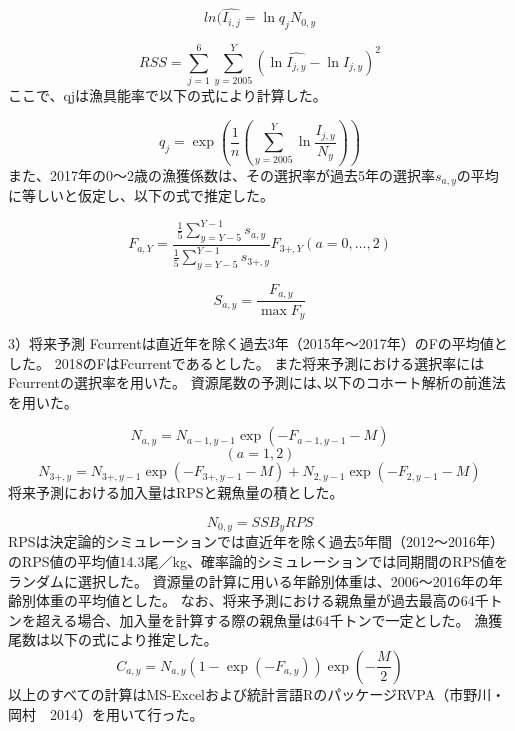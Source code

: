 \begin{equation}
 ln(\hat{I_{i,j}}= \ln{q_{j}}N_{0,y} \label{eq:tuningformula}
\end{equation}

\begin{equation}
 RSS = \sum_{j=1}^6 \sum_{y=2005}^Y \left( \ln{\hat{I_{j,y}}} - \ln{I_{j,y}}  \right) ^2 \label{eq:tuningOBJ}
\end{equation}
ここで、qjは漁具能率で以下の式により計算した。

\begin{equation}
 q_{j} = \exp{ \left( \frac{1}{n} \left( \sum_{y=2005}^Y \ln{ \frac{I_{j,y}}{N_y}} \right) \right)} \label{eq:catchabilityCF}
\end{equation}
また、2017年の0～2歳の漁獲係数は、その選択率が過去5年の選択率$s_{a,y}$の平均に等しいと仮定し、以下の式で推定した。

\begin{equation}
 F_{a,Y} = \frac{ \frac{1}{5} \sum_{y=Y-5}^{Y-1} s_{a,y}}{ \frac{1}{5}\sum_{y=Y-5}^{Y-1} s_{3+,y}}F_{3+,Y} (a=0,…,2) \label{eq:terminalF}
\end{equation}

\begin{equation}
 S_{a,y} = \frac{F_{a,y}}{\max{F_{y}}} \label{eq:selectivity}
\end{equation}

3）将来予測
Fcurrentは直近年を除く過去3年（2015年～2017年）のFの平均値とした。
2018のFはFcurrentであるとした。
また将来予測における選択率にはFcurrentの選択率を用いた。
資源尾数の予測には､以下のコホート解析の前進法を用いた｡



\begin{equation}
 N_{a,y} = N_{a-1,y-1}\exp{\left(-F_{a-1,y-1}-M\right)} \label{eq:normaltfuture}
\end{equation}
 \begin{equation}
(a=1,2)	
\end{equation}
\begin{equation} 
 N_{3+,y} = N_{3+,y-1}\exp{\left(-F_{3+,y-1}-M\right)} + N_{2,y-1}\exp{\left(-F_{2,y-1}-M\right)} \label{futureplus}
\end{equation}
将来予測における加入量はRPSと親魚量の積とした。

\begin{equation}
 N_{0,y} = SSB_{y}RPS \label{eq:futureR}
\end{equation}
RPSは決定論的シミュレーションでは直近年を除く過去5年間（2012～2016年）のRPS値の平均値14.3尾／kg、確率論的シミュレーションでは同期間のRPS値をランダムに選択した。
資源量の計算に用いる年齢別体重は、2006～2016年の年齢別体重の平均値とした。
なお、将来予測における親魚量が過去最高の64千トンを超える場合、加入量を計算する際の親魚量は64千トンで一定とした。
漁獲尾数は以下の式により推定した｡
\begin{equation}
 C_{a,y} = N_{a,y}\left(1-\exp{(-F_{a,y})}\right)\exp{\left(-\frac{M}{2}\right)} \label{eq:futurecatch}
\end{equation}
以上のすべての計算はMS-Excelおよび統計言語RのパッケージRVPA（市野川・岡村　2014）を用いて行った。
